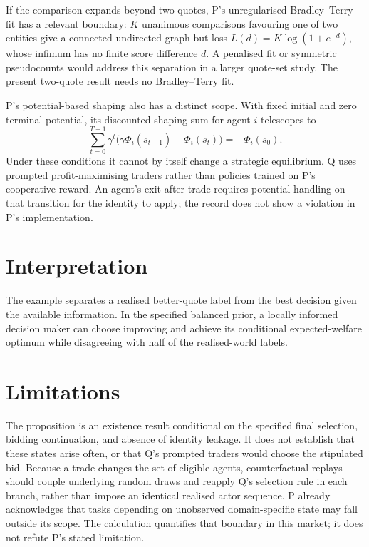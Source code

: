 \documentclass{article}
\begin{document}
If the comparison expands beyond two quotes, P's unregularised Bradley--Terry fit has a relevant boundary:
\(K\) unanimous comparisons favouring one of two entities give a connected undirected graph but loss
\(L(d)=K\log(1+e^{-d})\), whose infimum has no finite score difference \(d\). A penalised fit or symmetric
pseudocounts would address this separation in a larger quote-set study. The present two-quote result needs no
Bradley--Terry fit.

P's potential-based shaping also has a distinct scope. With fixed initial and zero terminal potential, its
discounted shaping sum for agent \(i\) telescopes to
\[
\sum_{t=0}^{T-1}\gamma^t\bigl(\gamma\Phi_i(s_{t+1})-\Phi_i(s_t)\bigr)=-\Phi_i(s_0).
\]
Under these conditions it cannot by itself change a strategic equilibrium. Q uses prompted profit-maximising
traders rather than policies trained on P's cooperative reward. An agent's exit after trade requires potential
handling on that transition for the identity to apply; the record does not show a violation in P's
implementation.

\section{Interpretation}

The example separates a realised better-quote label from the best decision given the available information. In
the specified balanced prior, a locally informed decision maker can choose improving and achieve its
conditional expected-welfare optimum while disagreeing with half of the realised-world labels.

\section{Limitations}

The proposition is an existence result conditional on the specified final selection, bidding continuation, and
absence of identity leakage. It does not establish that these states arise often, or that Q's prompted traders
would choose the stipulated bid. Because a trade changes the set of eligible agents, counterfactual replays
should couple underlying random draws and reapply Q's selection rule in each branch, rather than impose an
identical realised actor sequence. P already acknowledges that tasks depending on unobserved domain-specific
state may fall outside its scope. The calculation quantifies that boundary in this market; it does not refute
P's stated limitation.
\end{document}
